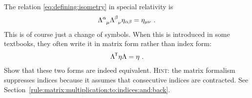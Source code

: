 \documentclass[12pt, oneside]{report}    %
\begin{document}
\begin{exercise}
\label{ex:lorentz:definition:indices}
The relation \eqref{eq:defining:isometry} in special relativity is
\begin{align}
    \Lambda\aij{\alpha}{\mu} \Lambda\aij{\beta}{\nu} \eta_{\alpha\beta} = \eta_{\mu\nu} \ .
\end{align}
This is of course just a change of symbols. When this is introduced in some textbooks, they often write it in matrix form rather than index form:
\begin{align}
    \Lambda^{\mkern-1.5mu\mathsf{T}} \eta \Lambda = \eta \ .
\end{align}
Show that these two forms are indeed equivalent. \textsc{Hint}: the matrix formalism suppresses indices because it assumes that consecutive indices are contracted. See Section~\ref{rule:matrix:multiplication:to:indices:and:back}.
\end{exercise}
% 
\end{document}
